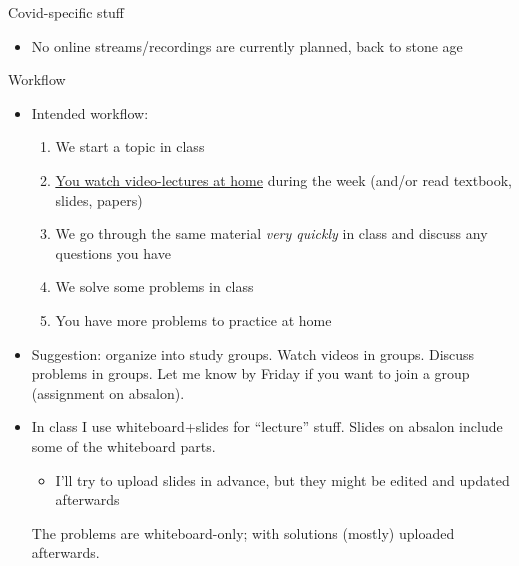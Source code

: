 \documentclass[english,10pt
,aspectratio=169
]{beamer}
\begin{document}
\begin{frame}{Covid-specific stuff}
	\begin{itemize}
		\item No online streams/recordings are currently planned, back to stone age
	\end{itemize}
\end{frame}


\begin{frame}{Workflow}
	\begin{itemize}
		\item Intended workflow: 
		\begin{enumerate}
			\item We start a topic in class
			\item \href{https://www.youtube.com/playlist?list=PL4pUs4P_j1WasI0kO99OgNNd_hJwpct4D}{\uline{You watch video-lectures at home}} during the week (and/or read textbook, slides, papers)
			\item We go through the same material \emph{very quickly} in class and discuss any questions you have
			\item We solve some problems in class
			\item You have more problems to practice at home
		\end{enumerate}
		\pause
		\item Suggestion: organize into study groups. Watch videos in groups. Discuss problems in groups. Let me know by Friday if you want to join a group (assignment on absalon).
		\pause
		\item In class I use whiteboard+slides for ``lecture'' stuff. Slides on absalon include some of the whiteboard parts.
		\begin{itemize}
			\item I'll try to upload slides in advance, but they might be edited and updated afterwards
		\end{itemize}
		The problems are whiteboard-only; with solutions (mostly) uploaded afterwards.
	\end{itemize}
\end{frame}
\end{document}
